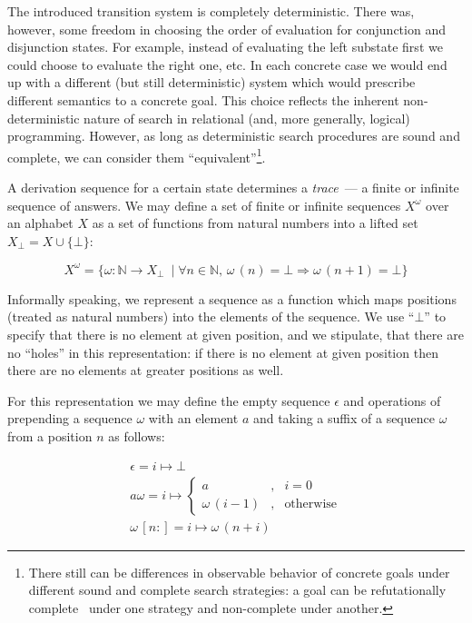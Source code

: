 The introduced transition system is completely deterministic. There was, however, some freedom in choosing the order of evaluation for conjunction and
disjunction states. For example, instead of evaluating the left substate first we could choose to evaluate the right one, etc. In each concrete case we would
end up with a different (but still deterministic) system which would prescribe different semantics to a concrete goal. This choice reflects the inherent
non-deterministic nature of search in relational (and, more generally, logical) programming. However, as long as deterministic search procedures
are sound and complete, we can consider them ``equivalent''\footnote{There still can be differences in observable behavior of concrete goals under different
sound and complete search strategies: a goal can be refutationally complete~\cite{WillThesis} under one strategy and non-complete under another.}.

A derivation sequence for a certain state determines a \emph{trace}~--- a finite or infinite sequence of answers. We may define a set of finite or infinite
sequences $X^\omega$ over an alphabet $X$ as a set of functions from natural numbers into a lifted set $X_\bot=X\cup\{\bot\}$:

\[
X^\omega=\{\omega : \mathbb{N}\to X_\bot\ \mid \forall n\in\mathbb{N},\, \omega\,(n)=\bot\Rightarrow \omega\,(n+1)=\bot\}
\]

Informally speaking, we represent a sequence as a function which maps positions (treated as natural numbers) into the elements of the sequence. We use ``$\bot$''
to specify that there is no element at given position, and we stipulate, that there are no ``holes'' in this representation: if there is no element at given
position then there are no elements at greater positions as well. 

For this representation we may define the empty sequence $\epsilon$ and operations of prepending a sequence $\omega$ with an element $a$ and taking a suffix of
a sequence $\omega$ from a position $n$ as follows:

\begin{gather*}
  \epsilon = i \mapsto \bot\\[2mm]
  a\omega = i \mapsto \left\{
  \begin{array}{rcl}
    a &,& i = 0\\
    \omega\,(i-1)&,&\mbox{otherwise}
  \end{array}
  \right.\\[2mm]
  \omega\,[n:]=i\mapsto\omega\,(n+i)
\end{gather*}

